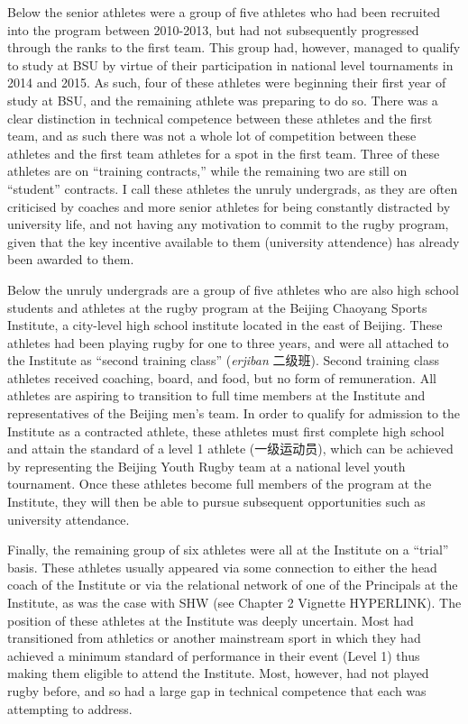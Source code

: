 

Below the senior athletes were a group of five athletes who had been recruited into the program between 2010-2013, but had not subsequently progressed through the ranks to the first team. This group had, however, managed to qualify to study at BSU by virtue of their participation in national level tournaments in 2014 and 2015. As such, four of these athletes were beginning their first year of study at BSU, and the remaining athlete was preparing to do so. There was a clear distinction in technical competence between these athletes and the first team, and as such there was not a whole lot of competition between these athletes and the first team athletes for a spot in the first team.  Three of these athletes are on ``training contracts,'' while the remaining two are still on ``student'' contracts.  I call these athletes the unruly undergrads, as they are often criticised by coaches and more senior athletes for being constantly distracted by university life, and not having any motivation to commit to the rugby program, given that the key incentive available to them (university attendence) has already been awarded to them.



Below the unruly undergrads are a group of five athletes who are also high school students and athletes at the rugby program at the Beijing Chaoyang Sports Institute, a city-level high school institute located in the east of Beijing.  These athletes had been playing rugby for one to three years, and were all attached to the Institute as ``second training class'' (\textit{erjiban} 二级班).  Second training class athletes received coaching, board, and food, but no form of remuneration.  All athletes are aspiring to transition to full time members at the Institute and representatives of the Beijing men's team.  In order to qualify for admission to the Institute as a contracted athlete, these athletes must first complete high school and attain the standard of a level 1 athlete (一级运动员), which can be achieved by representing the Beijing Youth Rugby team at a national level youth tournament.  Once these athletes become full members of the program at the Institute, they will then be able to pursue subsequent opportunities such as university attendance.

Finally, the remaining group of six athletes were all at the Institute on a ``trial'' basis.  These athletes usually appeared via some connection to either the head coach of the Institute or via the relational network of one of the Principals at the Institute, as was the case with SHW (see Chapter 2 Vignette HYPERLINK). The position of these athletes at the Institute was deeply uncertain.  Most had transitioned from athletics or another mainstream sport in which they had achieved a minimum standard of performance in their event (Level 1) thus making them eligible to attend the Institute.  Most, however, had not played rugby before, and so had a large gap in technical competence that each was attempting to address.


